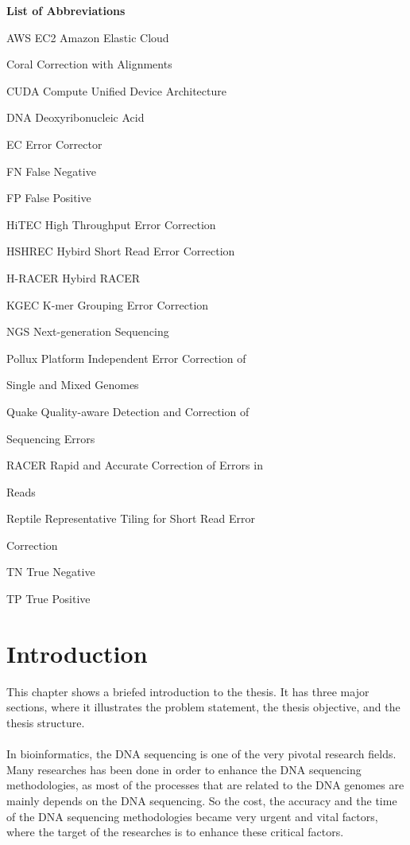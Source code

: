 \documentclass[12pt,openany]{llncs}
\newcommand{\abbrlabel}[1]{\makebox[4cm][l]{\textbf{#1}\ \dotfill}}
\newenvironment{abbreviations}{\begin{list}{}{\renewcommand{\makelabel}{\abbrlabel}}}{\end{list}}
\begin{document}
{\Huge\bfseries List of Abbreviations}
\\
\begin{abbreviations}
\item[AWS EC2] Amazon Elastic Cloud
\item[Coral] Correction with Alignments
\item[CUDA] Compute Unified Device Architecture
\item[DNA] Deoxyribonucleic Acid
\item[EC] Error Corrector
\item[FN] False Negative
\item[FP] False Positive
\item[HiTEC] High Throughput Error Correction
\item[HSHREC] Hybird Short Read Error Correction
\item[H-RACER] Hybird RACER
\item[KGEC] K-mer Grouping Error Correction
\item[NGS] Next-generation Sequencing
\item[Pollux] Platform Independent Error Correction of 

\noindent\hspace{3.6cm}Single and Mixed Genomes
\item[Quake] Quality-aware Detection and Correction of 

\noindent\hspace{3.6cm}Sequencing Errors
\item[RACER] Rapid and Accurate Correction of Errors in 

\noindent\hspace{3.6cm}Reads
\item[Reptile] Representative Tiling for Short Read Error

\noindent\hspace{3.6cm}Correction
\item[TN] True Negative
\item[TP] True Positive
\end{abbreviations}

\chapter{\label{chap:1} Introduction}
This chapter shows a briefed introduction to the thesis. It has three major sections, where it illustrates the problem statement, the thesis objective, and the thesis structure.
\\
\\
In bioinformatics, the DNA sequencing is one of the very pivotal research fields. Many researches has been done in order to enhance the DNA sequencing methodologies, as most of the processes that are related to the DNA genomes are mainly depends on the DNA sequencing. So the cost, the accuracy and the time of the DNA sequencing methodologies became very urgent and vital factors, where the target of the researches is to enhance these critical factors.
\end{document}
